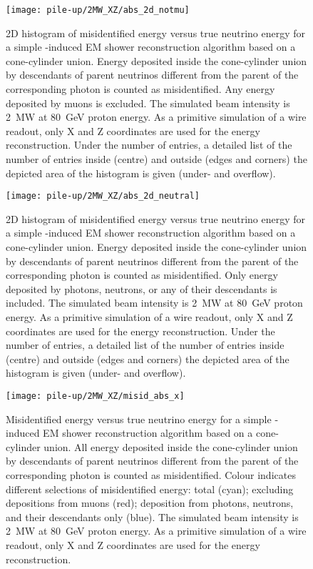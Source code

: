 \begin{figure}[htb]
	\centering
	\texttt{[image: pile-up/2MW\_XZ/abs\_2d\_notmu]}
	\caption{2D histogram of misidentified energy versus true neutrino energy for a simple \Pgpz-induced EM shower reconstruction algorithm based on a cone-cylinder union.
		Energy deposited inside the cone-cylinder union by descendants of parent neutrinos different from the parent of the corresponding \Pgpz photon is counted as misidentified.
		Any energy deposited by muons is excluded.
		The simulated beam intensity is \SI{2}{\mega\watt} at \SI{80}{\giga\electronvolt} proton energy.
		As a primitive simulation of a wire readout, only X and Z coordinates are used for the energy reconstruction.
		Under the number of entries, a detailed list of the number of entries inside (centre) and outside (edges and corners) the depicted area of the histogram is given (under- and overflow).}
\end{figure}

\begin{figure}[htb]
	\centering
	\texttt{[image: pile-up/2MW\_XZ/abs\_2d\_neutral]}
	\caption{2D histogram of misidentified energy versus true neutrino energy for a simple \Pgpz-induced EM shower reconstruction algorithm based on a cone-cylinder union.
		Energy deposited inside the cone-cylinder union by descendants of parent neutrinos different from the parent of the corresponding \Pgpz photon is counted as misidentified.
		Only energy deposited by photons, neutrons, or any of their descendants is included.
		The simulated beam intensity is \SI{2}{\mega\watt} at \SI{80}{\giga\electronvolt} proton energy.
		As a primitive simulation of a wire readout, only X and Z coordinates are used for the energy reconstruction.
		Under the number of entries, a detailed list of the number of entries inside (centre) and outside (edges and corners) the depicted area of the histogram is given (under- and overflow).}
\end{figure}

\begin{figure}[htb]
	\centering
	\texttt{[image: pile-up/2MW\_XZ/misid\_abs\_x]}
	\caption{Misidentified energy versus true neutrino energy for a simple \Pgpz-induced EM shower reconstruction algorithm based on a cone-cylinder union.
		All energy deposited inside the cone-cylinder union by descendants of parent neutrinos different from the parent of the corresponding \Pgpz photon is counted as misidentified.
		Colour indicates different selections of misidentified energy: total (cyan); excluding depositions from muons (red); deposition from photons, neutrons, and their descendants only (blue).
		The simulated beam intensity is \SI{2}{\mega\watt} at \SI{80}{\giga\electronvolt} proton energy.
		As a primitive simulation of a wire readout, only X and Z coordinates are used for the energy reconstruction.}
\end{figure}

